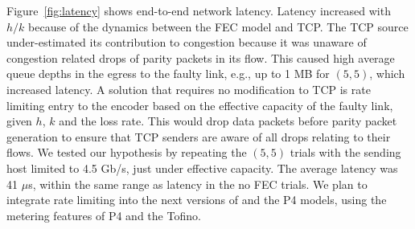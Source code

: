 Figure~\ref{fig:latency} shows end-to-end network latency. Latency increased
with $h/k$ because of the dynamics between the FEC model and TCP. The TCP
source under-estimated its contribution to congestion because it was unaware
of congestion related drops of parity packets in its flow. This caused high
average queue depths in the egress to the faulty link, e.g., up to 1 MB for
$(5,5)$, which increased latency. A solution that requires no modification to
TCP is rate limiting entry to the encoder based on the effective capacity of
the faulty link, given $h$, $k$ and the loss rate. This would drop data
packets before parity packet generation to ensure that TCP senders are aware
of  all drops relating to their flows. We tested our hypothesis by repeating
the $(5, 5)$ trials with the sending host limited to 4.5 Gb/s, just under
effective capacity. The average latency was 41 $\mu$s, within the same range
as latency in the no FEC trials. We plan to integrate rate limiting into the
next versions of \OurSys and the P4 models, using the metering features of P4
and the Tofino.



